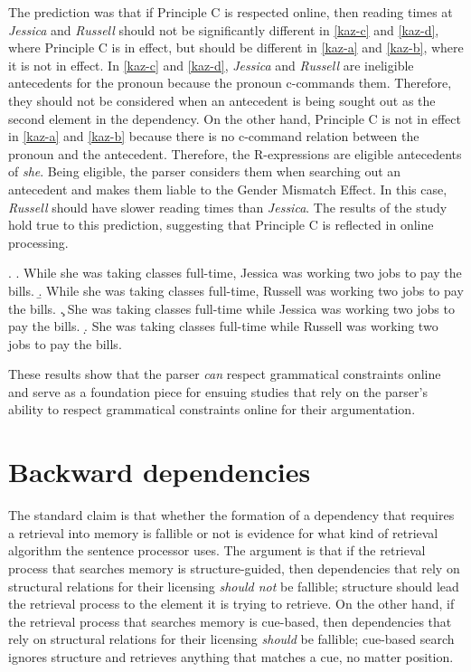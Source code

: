 \documentclass[12pt,letterpaper]{article}
\begin{document}
The prediction was that if Principle C is respected online, then reading times at \emph{Jessica} and \emph{Russell} should not be significantly different in \ref{kaz-c} and \ref{kaz-d}, where Principle C is in effect, but should be different in \ref{kaz-a} and \ref{kaz-b}, where it is not in effect. In \ref{kaz-c} and \ref{kaz-d}, \emph{Jessica} and \emph{Russell} are ineligible antecedents for the pronoun because the pronoun c-commands them. Therefore, they should not be considered when an antecedent is being sought out as the second element in the dependency. On the other hand, Principle C is not in effect in \ref{kaz-a} and \ref{kaz-b} because there is no c-command relation between the pronoun and the antecedent. Therefore, the R-expressions are eligible antecedents of \emph{she}. Being eligible, the parser considers them when searching out an antecedent and makes them liable to the Gender Mismatch Effect. In this case, \emph{Russell} should have slower reading times than \emph{Jessica}. The results of the study hold true to this prediction, suggesting that Principle C is reflected in online processing.

\ex. \label{kaz} \a. While she was taking classes full-time, Jessica was working two jobs to pay the bills. \label{kaz-a}
     \b. While she was taking classes full-time, Russell was working two jobs to pay the bills. \label{kaz-b}
     \c. She was taking classes full-time while Jessica was working two jobs to pay the bills. \label{kaz-c}
     \d. She was taking classes full-time while Russell was working two jobs to pay the bills. \label{kaz-d}

These results show that the parser \emph{can} respect grammatical constraints online and serve as a foundation piece for ensuing studies that rely on the parser's ability to respect grammatical constraints online for their argumentation.

\section{Backward dependencies}

The standard claim is that whether the formation of a dependency that requires a retrieval into memory is fallible or not is evidence for what kind of retrieval algorithm the sentence processor uses. The argument is that if the retrieval process that searches memory is structure-guided, then dependencies that rely on structural relations for their licensing \emph{should not} be fallible; structure should lead the retrieval process to the element it is trying to retrieve. On the other hand, if the retrieval process that searches memory is cue-based, then dependencies that rely on structural relations for their licensing \emph{should} be fallible; cue-based search ignores structure and retrieves anything that matches a cue, no matter position.
\end{document}

